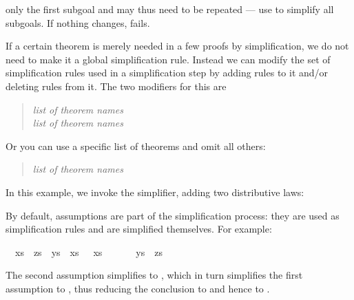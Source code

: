 \begin{isabellebody}
\begin{isamarkuptext}
only the first subgoal and may thus need to be repeated --- use
 to simplify all subgoals.
If nothing changes,  fails.%
\end{isamarkuptext}%
\isamarkuptrue%
%
\isamarkuptrue%
%
\begin{isamarkuptext}%
%
If a certain theorem is merely needed in a few proofs by simplification,
we do not need to make it a global simplification rule. Instead we can modify
the set of simplification rules used in a simplification step by adding rules
to it and/or deleting rules from it. The two modifiers for this are
\begin{quote}
 \textit{list of theorem names}\\
 \textit{list of theorem names}
\end{quote}
Or you can use a specific list of theorems and omit all others:
\begin{quote}
 \textit{list of theorem names}
\end{quote}
In this example, we invoke the simplifier, adding two distributive
laws:
\begin{quote}
\end{quote}%
\end{isamarkuptext}%
\isamarkuptrue%
%
\isamarkuptrue%
%
\begin{isamarkuptext}%
By default, assumptions are part of the simplification process: they are used
as simplification rules and are simplified themselves. For example:%
\end{isamarkuptext}%
\isamarkuptrue%
\ {\isachardoublequote}{\isasymlbrakk}\ xs\ {\isacharat}\ zs\ {\isacharequal}\ ys\ {\isacharat}\ xs{\isacharsemicolon}\ {\isacharbrackleft}{\isacharbrackright}\ {\isacharat}\ xs\ {\isacharequal}\ {\isacharbrackleft}{\isacharbrackright}\ {\isacharat}\ {\isacharbrackleft}{\isacharbrackright}\ {\isasymrbrakk}\ {\isasymLongrightarrow}\ ys\ {\isacharequal}\ zs{\isachardoublequote}\isanewline
\isamarkupfalse%
\isamarkupfalse%
\isamarkupfalse%
%
\begin{isamarkuptext}%
\noindent
The second assumption simplifies to , which in turn
simplifies the first assumption to , thus reducing the
conclusion to  and hence to .


\end{isamarkuptext}
\end{isabellebody}
